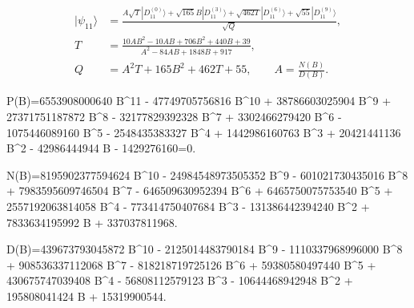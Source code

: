 \begin{align}
|\psi_{11}\rangle&=\frac{A\sqrt{T}|D_{11}^{(0)}\rangle+\sqrt{165}B|D_{11}^{(3)}\rangle+\sqrt{462T}|D_{11}^{(6)}\rangle+\sqrt{55}|D_{11}^{(9)}\rangle}{\sqrt{Q}},\\
T&=\frac{10AB^2-10AB+706B^2+440B+39}{A^2-84AB+1848B+917},\\
Q&=A^2T+165B^2+462T+55,\qquad A=\frac{N(B)}{D(B)}.
\end{align}

P(B)=6553908000640 B^{11} - 47749705756816 B^{10} + 38786603025904 B^{9} + 27371751187872 B^{8} - 32177829392328 B^{7} + 3302466279420 B^{6} - 1075446089160 B^{5} - 2548435383327 B^{4} + 1442986160763 B^{3} + 20421441136 B^{2} - 42986444944 B - 1429276160=0.

N(B)=8195902377594624 B^{10} - 24984548973505352 B^{9} - 601021730435016 B^{8} + 7983595609746504 B^{7} - 646509630952394 B^{6} + 6465750075753540 B^{5} + 2557192063814058 B^{4} - 773414750407684 B^{3} - 131386442394240 B^{2} + 7833634195992 B + 337037811968.

D(B)=439673793045872 B^{10} - 2125014483790184 B^{9} - 1110337968996000 B^{8} + 908536337112068 B^{7} - 818218719725126 B^{6} + 59380580497440 B^{5} + 430675747039408 B^{4} - 56808112579123 B^{3} - 10644468942948 B^{2} + 195808041424 B + 15319900544.
